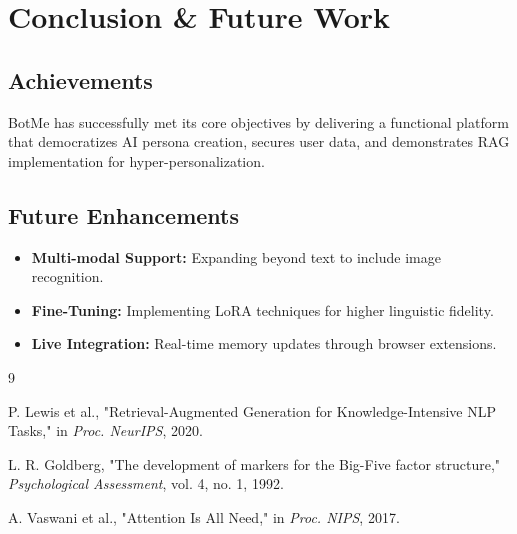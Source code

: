 \documentclass[12pt,a4paper]{report}
\begin{document}
\chapter{Conclusion \& Future Work}

\section{Achievements}
BotMe has successfully met its core objectives by delivering a functional platform that democratizes AI persona creation, secures user data, and demonstrates RAG implementation for hyper-personalization.

\section{Future Enhancements}
\begin{itemize}
    \item \textbf{Multi-modal Support:} Expanding beyond text to include image recognition.
    \item \textbf{Fine-Tuning:} Implementing LoRA techniques for higher linguistic fidelity.
    \item \textbf{Live Integration:} Real-time memory updates through browser extensions.
\end{itemize}

\newpage
\renewcommand{\bibname}{References}
\begin{thebibliography}{9}

P. Lewis et al., "Retrieval-Augmented Generation for Knowledge-Intensive NLP Tasks," in \textit{Proc. NeurIPS}, 2020.

L. R. Goldberg, "The development of markers for the Big-Five factor structure," \textit{Psychological Assessment}, vol. 4, no. 1, 1992.

A. Vaswani et al., "Attention Is All Need," in \textit{Proc. NIPS}, 2017.

\end{thebibliography}
\end{document}
